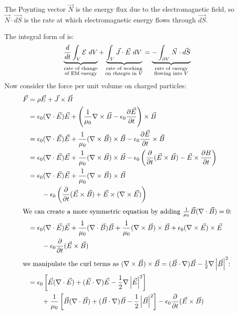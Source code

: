\documentclass[../Main.tex]{subfiles}
\begin{document}
\begin{remark}
    The Poynting vector $\vec{N}$ is the energy flux due to the electromagnetic field, so $\vec{N} \cdot \vec{dS}$ is the rate at which electromagnetic energy flows through $\vec{dS}$.
\end{remark}
The integral form of  is:
\begin{equation*}
    \underbrace{\frac{d}{dt} \int_V \mathcal{E}~dV}_{\substack{\text{rate of change}\\\text{of EM energy}}} + \underbrace{\int_V \vec{J} \cdot \vec{E}~dV}_{\substack{\text{rate of working}\\\text{on charges in $V$}}} = \underbrace{-\int_{\partial V} \vec{N} \cdot \vec{dS}}_{\substack{\text{rate of energy}\\\text{flowing into $V$}}}
\end{equation*}
Now consider the force per unit volume on charged particles:
\begin{align*}
    \vec{F} &= \rho \vec{E} + \vec{J} \times \vec{B} \\
    &= \epsilon_0 (\nabla \cdot \vec{E}) \vec{E} + \left(\frac1{\mu_0} \nabla \times \vec{B} - \epsilon_0 \frac{\partial \vec{E}}{\partial t}\right) \times \vec{B} \\
    &= \epsilon_0 (\nabla \cdot \vec{E}) \vec{E} + \frac1{\mu_0} (\nabla \times \vec{B}) \times \vec{B} - \epsilon_0 \frac{\partial \vec{E}}{\partial t}\times \vec{B} \\
    &= \epsilon_0 (\nabla \cdot \vec{E}) \vec{E} + \frac1{\mu_0} (\nabla \times \vec{B}) \times \vec{B} - \epsilon_0 \left(\frac{\partial}{\partial t} (\vec{E} \times \vec{B}) - \vec{E} \times \frac{\partial B}{\partial t}\right) \\
    &= \epsilon_0 (\nabla \cdot \vec{E}) \vec{E} + \frac1{\mu_0} (\nabla \times \vec{B}) \times \vec{B}\\
    &\qquad - \epsilon_0 \left(\frac{\partial}{\partial t} (\vec{E} \times \vec{B}) + \vec{E} \times (\nabla \times \vec{E})\right) \\
    \intertext{We can create a more symmetric equation by adding $\frac{1}{\mu_0}\vec{B} (\nabla \cdot \vec{B}) = 0$:}
    &= \epsilon_0 (\nabla \cdot \vec{E}) \vec{E} + \frac1{\mu_0} (\nabla \cdot \vec{B}) \vec{B} + \frac1{\mu_0} (\nabla \times \vec{B}) \times \vec{B} + \epsilon_0 (\nabla \times \vec{E}) \times \vec{E}\\
    &\qquad- \epsilon_0 \frac{\partial}{\partial t} (\vec{E} \times \vec{B}) \\
    \intertext{we manipulate the curl terms as $(\nabla \times \vec{B}) \times\vec{B} = (\vec{B} \cdot \nabla)\vec{B} - \frac12 \nabla \left|\vec{B}\right|^2$:}
    &= \epsilon_0 \left[\vec{E} (\nabla \cdot \vec{E}) + (\vec{E} \cdot \nabla)\vec{E} - \frac12 \nabla \left|\vec{E}\right|^2\right]\\
    &\qquad + \frac1{\mu_0} \left[\vec{B} (\nabla \cdot \vec{B}) + (\vec{B} \cdot \nabla)\vec{B} - \frac12\left|\vec{B}\right|^2\right] - \epsilon_0 \frac{\partial }{\partial t} (\vec{E} \times \vec{B})
\end{align*}
\end{document}
